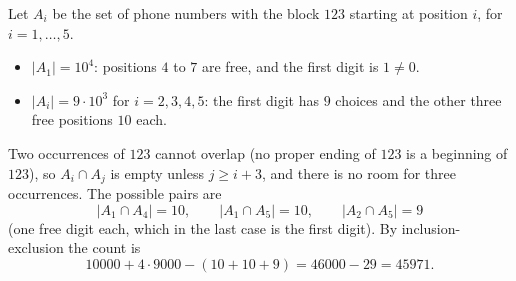 Let $A_i$ be the set of phone numbers with the block $123$ starting at position $i$, for $i=1,\dots,5$.
\begin{itemize}
\item $|A_1|=10^4$: positions $4$ to $7$ are free, and the first digit is $1\ne0$.
\item $|A_i|=9\cdot10^3$ for $i=2,3,4,5$: the first digit has $9$ choices and the other three free positions $10$ each.
\end{itemize}
Two occurrences of $123$ cannot overlap (no proper ending of $123$ is a beginning of $123$), so $A_i\cap A_j$ is empty unless $j\ge i+3$, and there is no room for three occurrences. The possible pairs are
\[|A_1\cap A_4|=10,\qquad |A_1\cap A_5|=10,\qquad |A_2\cap A_5|=9\]
(one free digit each, which in the last case is the first digit). By inclusion-exclusion the count is
\[10000+4\cdot9000-(10+10+9)=46000-29=\boxed{45971}.\]
